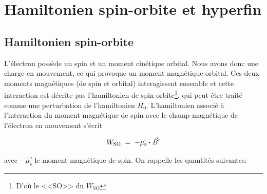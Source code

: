 \newpage
\section{Hamiltonien spin-orbite et hyperfin}
\subsection{Hamiltonien spin-orbite}


L'électron possède un spin et un moment cinétique orbital. Nous avons donc une charge en mouvement, ce qui provoque un moment magnétique orbital. Ces deux moments magnétiques (de spin et orbital) interagissent ensemble et cette interaction est décrite pas l'hamiltonien de spin-orbite\footnote{D'où le <<SO>> du $W_\text{SO}$}, qui peut être traité comme une perturbation de l'hamiltonien $H_0$. L'hamiltonien associé à l'interaction du moment magnétique de spin avec le champ magnétique de l’électron en mouvement s'écrit

\[
    W_\text{SO} \; = \;  -\vec{\mu_\text{s}}\boldsymbol{\cdot}\vec{B}'
\]

avec $-\vec{\mu_\text{s}}$ le moment magnétique de spin. On rappelle les quantités suivantes:

